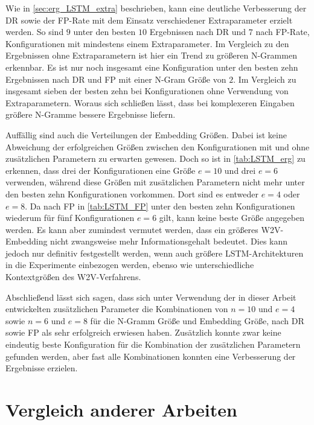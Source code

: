 Wie in \autoref{sec:erg_LSTM_extra} beschrieben, kann eine deutliche Verbesserung der \ac{DR} sowie  der \ac{FP}-Rate mit dem Einsatz verschiedener Extraparameter erzielt werden.
So sind $9$ unter den besten $10$ Ergebnissen nach \ac{DR} und $7$ nach \ac{FP}-Rate, Konfigurationen mit mindestens einem Extraparameter.
Im Vergleich zu den Ergebnissen ohne Extraparametern ist hier ein Trend zu größeren N-Grammen erkennbar.
Es ist nur noch insgesamt eine Konfiguration unter den besten zehn Ergebnissen nach \ac{DR} und \ac{FP} mit einer N-Gram Größe von $2$.
Im Vergleich zu insgesamt sieben  der besten zehn bei Konfigurationen ohne Verwendung von Extraparametern.
Woraus sich schließen lässt, dass bei komplexeren Eingaben größere N-Gramme bessere Ergebnisse liefern.\par\medskip
Auffällig sind auch die Verteilungen der Embedding Größen.
Dabei ist keine Abweichung der erfolgreichen Größen zwischen den Konfigurationen mit und ohne zusätzlichen Parametern zu erwarten gewesen.
Doch so ist in \autoref{tab:LSTM_erg} zu erkennen, dass drei der Konfigurationen eine Größe $e=10$ und drei $e=6$ verwenden, während diese Größen mit zusätzlichen Parametern nicht mehr unter den besten zehn Konfigurationen vorkommen.
Dort sind es entweder $e=4$ oder $e=8$.
Da nach \ac{FP} in \autoref{tab:LSTM_FP} unter den besten zehn Konfigurationen wiederum für fünf Konfigurationen $e=6$ gilt, kann keine beste Größe angegeben werden.
Es kann aber zumindest vermutet werden, dass ein größeres \ac{W2V}-Embedding nicht zwangsweise mehr Informationsgehalt bedeutet.
Dies kann jedoch nur definitiv festgestellt werden, wenn auch größere \ac{LSTM}-Architekturen in die Experimente einbezogen werden, ebenso wie unterschiedliche Kontextgrößen des \ac{W2V}-Verfahrens.\par\medskip

Abschließend lässt sich sagen, dass sich unter Verwendung der in dieser Arbeit entwickelten zusätzlichen Parameter die Kombinationen von $n=10$ und $e=4$ sowie $n=6$ und $e=8$ für die N-Gramm Größe und Embedding Größe, nach \ac{DR} sowie \ac{FP} als sehr erfolgreich erwiesen haben.
Zusätzlich konnte zwar keine eindeutig beste Konfiguration für die Kombination der zusätzlichen Parametern gefunden werden, aber fast alle Kombinationen konnten eine Verbesserung der Ergebnisse erzielen.

\section{Vergleich anderer Arbeiten}\label{sec:folgerungen_vgl}

